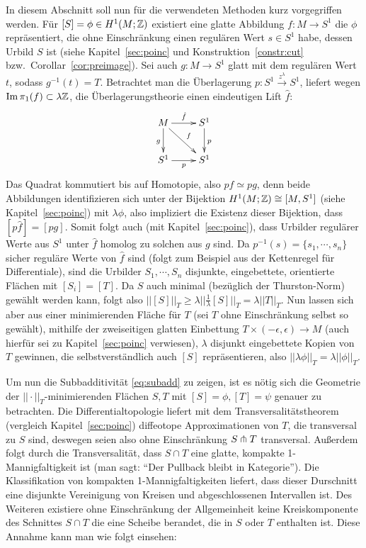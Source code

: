            In diesem Abschnitt soll nun für die verwendeten Methoden kurz vorgegriffen werden. Für $[S]=\phi \in H^1(M;\mathbb{Z})$ existiert eine glatte Abbildung $f:M \to S^1$ die $\phi$ repräsentiert, die ohne Einschränkung einen regulären Wert $s\in S^1$ habe, dessen Urbild $S$ ist (siehe Kapitel~\ref{sec:poinc} und Konstruktion~\ref{constr:cut} bzw.~Corollar~\ref{cor:preimage}). Sei auch $g:M \to S^1$ glatt mit dem regulären Wert $t$, sodass $g^{-1}(t)=T$. Betrachtet man die Überlagerung $p: S^1 \stackrel {z^\lambda} \to  S^1$, liefert wegen $\operatorname{Im}\pi_1(f) \subset \lambda \mathbb{Z}$, die Überlagerungstheorie einen eindeutigen Lift $\hat f$:
            \[
                \begin{xy}
                    \xymatrix{M \ar[r]^{\hat f} \ar[d]_g \ar[dr]^f&S^1 \ar[d]^p \\
                             S^1 \ar[r]_p & S^1}
                \end{xy}
            \]
            Das Quadrat kommutiert bis auf Homotopie, also $p\hat f \simeq p g$, denn beide Abbildungen identifizieren sich unter der Bijektion $H^1(M;\mathbb{Z}) \cong [M,S^1]$ (siehe Kapitel~\ref{sec:poinc}) mit $\lambda \phi$, also impliziert die Existenz dieser Bijektion, dass $[p\hat f] = [pg]$. Somit folgt auch (mit Kapitel~\ref{sec:poinc}), dass Urbilder regulärer Werte aus $S^1$ unter $\hat f$ homolog zu solchen aus $g$ sind. Da $p^{-1}(s)=\{s_1,\cdots,s_n\}$ sicher reguläre Werte von $\hat f$ sind (folgt zum Beispiel aus der Kettenregel für Differentiale), sind die Urbilder $S_1,\cdots,S_n$ disjunkte, eingebettete, orientierte Flächen mit $[S_i]=[T]$. Da $S$ auch minimal (bezüglich der Thurston-Norm) gewählt werden kann, folgt also $||[S]||_T \geq \lambda ||\frac 1\lambda [S]||_T = \lambda ||T||_T$. Nun lassen sich aber aus einer minimierenden Fläche für $T$ (sei $T$ ohne Einschränkung selbst so gewählt), mithilfe der zweiseitigen glatten Einbettung $T \times (-\epsilon,\epsilon) \to M$ (auch hierfür sei zu Kapitel~\ref{sec:poinc} verwiesen), $\lambda$ disjunkt eingebettete Kopien von $T$ gewinnen, die selbstverständlich auch $[S]$ repräsentieren, also $||\lambda \phi||_T = \lambda ||\phi||_T$. 

            Um nun die Subbadditivität \eqref{eq:subadd} zu zeigen, ist es nötig sich die Geometrie der $||\cdot||_T$-minimierenden Flächen $S,T$ mit $[S]=\phi, [T]=\psi$ genauer zu betrachten. Die Differentialtopologie liefert mit dem Transversalitätstheorem (vergleich Kapitel~\ref{sec:poinc}) diffeotope Approximationen von $T$, die transversal zu $S$ sind, deswegen seien also ohne Einschränkung $S \pitchfork T$ transversal. Außerdem folgt durch die Transversalität, dass $S\cap T$ eine glatte, kompakte 1-Mannigfaltigkeit ist (man sagt: "`Der Pullback bleibt in Kategorie"'). Die Klassifikation von kompakten 1-Mannigfaltigkeiten liefert, dass dieser Durschnitt eine disjunkte Vereinigung von Kreisen und abgeschlossenen Intervallen ist. Des Weiteren existiere ohne Einschränkung der Allgemeinheit keine Kreiskomponente des Schnittes $S\cap T$ die eine Scheibe berandet, die in $S$ oder $T$ enthalten ist. Diese Annahme kann man wie folgt einsehen:

